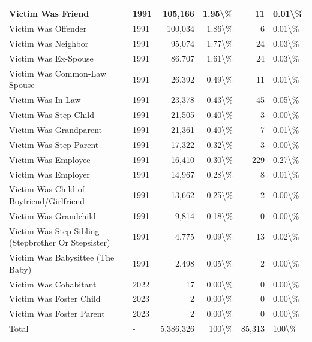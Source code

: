 \documentclass[
]{krantz}
\begin{document}
\begin{longtable}[t]{l|l|r|r|r|l}
\hline
Victim Was Friend & 1991 & 105,166 & 1.95\textbackslash{}\% & 11 & 0.01\textbackslash{}\%\\
\hline
Victim Was Offender & 1991 & 100,034 & 1.86\textbackslash{}\% & 6 & 0.01\textbackslash{}\%\\
\hline
Victim Was Neighbor & 1991 & 95,074 & 1.77\textbackslash{}\% & 24 & 0.03\textbackslash{}\%\\
\hline
Victim Was Ex-Spouse & 1991 & 86,707 & 1.61\textbackslash{}\% & 24 & 0.03\textbackslash{}\%\\
\hline
Victim Was Common-Law Spouse & 1991 & 26,392 & 0.49\textbackslash{}\% & 11 & 0.01\textbackslash{}\%\\
\hline
Victim Was In-Law & 1991 & 23,378 & 0.43\textbackslash{}\% & 45 & 0.05\textbackslash{}\%\\
\hline
Victim Was Step-Child & 1991 & 21,505 & 0.40\textbackslash{}\% & 3 & 0.00\textbackslash{}\%\\
\hline
Victim Was Grandparent & 1991 & 21,361 & 0.40\textbackslash{}\% & 7 & 0.01\textbackslash{}\%\\
\hline
Victim Was Step-Parent & 1991 & 17,322 & 0.32\textbackslash{}\% & 3 & 0.00\textbackslash{}\%\\
\hline
Victim Was Employee & 1991 & 16,410 & 0.30\textbackslash{}\% & 229 & 0.27\textbackslash{}\%\\
\hline
Victim Was Employer & 1991 & 14,967 & 0.28\textbackslash{}\% & 8 & 0.01\textbackslash{}\%\\
\hline
Victim Was Child of Boyfriend/Girlfriend & 1991 & 13,662 & 0.25\textbackslash{}\% & 2 & 0.00\textbackslash{}\%\\
\hline
Victim Was Grandchild & 1991 & 9,814 & 0.18\textbackslash{}\% & 0 & 0.00\textbackslash{}\%\\
\hline
Victim Was Step-Sibling (Stepbrother Or Stepsister) & 1991 & 4,775 & 0.09\textbackslash{}\% & 13 & 0.02\textbackslash{}\%\\
\hline
Victim Was Babysittee (The Baby) & 1991 & 2,498 & 0.05\textbackslash{}\% & 2 & 0.00\textbackslash{}\%\\
\hline
Victim Was Cohabitant & 2022 & 17 & 0.00\textbackslash{}\% & 0 & 0.00\textbackslash{}\%\\
\hline
Victim Was Foster Child & 2023 & 2 & 0.00\textbackslash{}\% & 0 & 0.00\textbackslash{}\%\\
\hline
Victim Was Foster Parent & 2023 & 2 & 0.00\textbackslash{}\% & 0 & 0.00\textbackslash{}\%\\
\hline
Total & - & 5,386,326 & 100\textbackslash{}\% & 85,313 & 100\textbackslash{}\%\\
\hline
\end{longtable}
\end{document}
